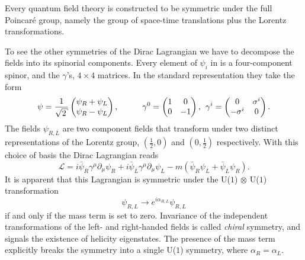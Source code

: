 Every quantum field theory is constructed to be symmetric under the full
Poincar\'e group, namely the group of space-time translations plus the Lorentz
transformations. 

To see the other symmetries of the Dirac Lagrangian we have to decompose the
fields into its spinorial components. Every element of $\psi_i$ in
 is a four-component spinor, and the $\gamma$'s, $4 \times 4$
matrices. In the standard representation they take the form
%
\begin{equation}
  \psi = \frac{1}{\sqrt{2}} \begin{pmatrix} \psi_R + \psi_L \\ \psi_R - \psi_L \end{pmatrix}, \hskip1cm
    \gamma^0 = \begin{pmatrix} 1 & 0 \\ 0 & -1 \end{pmatrix}, \hskip1ex
    \gamma^i = \begin{pmatrix} 0 & \sigma^i \\ -\sigma^i & 0 \end{pmatrix}.
\end{equation}
%
The fields $\psi_{R,L}$ are two component fields that transform under two
distinct representations of the Lorentz group, $(\frac{1}{2}, 0)$ and $(0,
\frac{1}{2})$ respectively. With this choice of basis the Dirac Lagrangian reads
%
\begin{equation}
  \mathcal{L} = i \bar{\psi}_R \gamma^{\mu}\partial_{\mu} \psi_R
    + i \bar{\psi}_L \gamma^{\mu}\partial_{\mu} \psi_L
    - m (\bar{\psi}_R\psi_L + \bar{\psi}_L\psi_R).
\end{equation}
%
It is apparent that this Lagrangian is symmetric under the U($1$) $\otimes$ U($1$)
transformation
%
\begin{equation} \label{eq:chiral_transformation}
  \psi_{R,L} \to e^{i \alpha_{R,L}} \psi_{R,L}
\end{equation}
%
if and only if the mass term is set to zero. Invariance of the independent
transformations of the left- and right-handed fields is called \emph{chiral}
symmetry, and signals the existence of helicity eigenstates. The presence of the
mass term explicitly breaks the symmetry into a single U($1$) symmetry, where
$\alpha_R = \alpha_L$.

